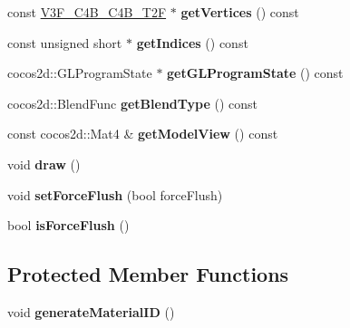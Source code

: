 \begin{DoxyCompactItemize}
const \hyperlink{structspine_1_1V3F__C4B__C4B__T2F}{V3\+F\+\_\+\+C4\+B\+\_\+\+C4\+B\+\_\+\+T2F} $\ast$ {\bfseries get\+Vertices} () const
\item 
\mbox{\label{classspine_1_1TwoColorTrianglesCommand_a70529611b4e993a025c19b3dddb17236}} 
const unsigned short $\ast$ {\bfseries get\+Indices} () const
\item 
\mbox{\label{classspine_1_1TwoColorTrianglesCommand_aec9b35a3fc12c2533eba775509981976}} 
cocos2d\+::\+G\+L\+Program\+State $\ast$ {\bfseries get\+G\+L\+Program\+State} () const
\item 
\mbox{\label{classspine_1_1TwoColorTrianglesCommand_a6be856838d64aed4ed88cfc4f75c5889}} 
cocos2d\+::\+Blend\+Func {\bfseries get\+Blend\+Type} () const
\item 
\mbox{\label{classspine_1_1TwoColorTrianglesCommand_a6a8e8d39935827b1de8b04a57834b85b}} 
const cocos2d\+::\+Mat4 \& {\bfseries get\+Model\+View} () const
\item 
\mbox{\label{classspine_1_1TwoColorTrianglesCommand_addb4950f498bb5e1b6a8b68d5896d45f}} 
void {\bfseries draw} ()
\item 
\mbox{\label{classspine_1_1TwoColorTrianglesCommand_a26a718261b7171fb878a1847369cc8a5}} 
void {\bfseries set\+Force\+Flush} (bool force\+Flush)
\item 
\mbox{\label{classspine_1_1TwoColorTrianglesCommand_afb7a8c02633665fcfb1f5985fa0fe9bc}} 
bool {\bfseries is\+Force\+Flush} ()
\end{DoxyCompactItemize}
\subsection*{Protected Member Functions}
\begin{DoxyCompactItemize}
\item 
\mbox{\label{classspine_1_1TwoColorTrianglesCommand_af31be7695d690323d6b44dc8e997a36a}} 
void {\bfseries generate\+Material\+ID} ()
\end{DoxyCompactItemize}
